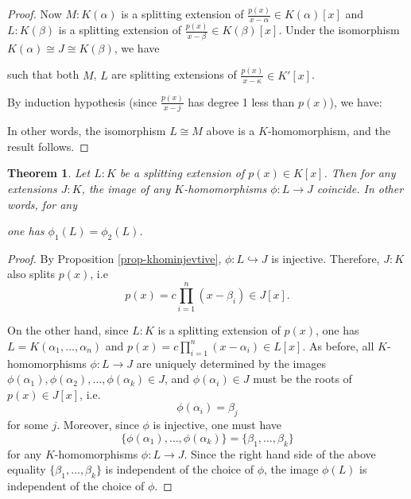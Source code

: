 \documentclass[11pt]{book}
\newtheorem{theorem}{Theorem}[section]
\begin{document}
\begin{proof}
Now $M:K(\alpha)$ is a splitting extension of $\frac{p(x)}{x - \alpha} \in K(\alpha)[x]$ and $L:K(\beta)$ is a splitting extension of $\frac{p(x)}{x - \beta} \in K(\beta)[x]$. Under the isomorphism $ K(\alpha) \cong J \cong K(\beta)$, we have
\begin{center} 
\end{center}
such that both $M$, $L$ are splitting extensions of $\frac{p(x)}{x - \kappa} \in K'[x]$. 

By induction hypothesis (since $\frac{p(x)}{x - j}$ has degree 1 less than $p(x)$), we have:
\begin{center} 
\end{center}
In other words, the isomorphism $L \cong M$ above is a $K$-homomorphism, and the result follows.
\end{proof}

\begin{theorem} \label{thm-splittingfieldsameimage}
Let $L:K$ be a splitting extension of $p(x) \in K[x]$. Then for any extensions $J:K$, the image of any $K$-homomorphisms $\phi: L \to J$ coincide. In other words, for any
\begin{center}
\end{center}
one has $\phi_1(L) = \phi_2(L)$.
\end{theorem}

\begin{proof}
By Proposition \ref{prop-khominjevtive}, $\phi: L \hookrightarrow J$ is injective. Therefore, $J:K$ also splits $p(x)$, i.e 
$$p(x) = c \prod_{i=1}^n (x-\beta_i) \in J[x].$$ 

On the other hand, since $L:K$ is a splitting extension of $p(x)$, one has $L = K(\alpha_1, \dots,\alpha_n)$ and
$\displaystyle p(x) = c \prod_{i=1}^n (x-\alpha_i) \in L[x]$.
As before, all $K$-homomorphisms $\phi: L \to J$ are uniquely determined by the images $\phi(\alpha_1), \phi(\alpha_2), \ldots, \phi(\alpha_k) \in J$, and $\phi(\alpha_i) \in J$ must be the roots of $p(x) \in J[x]$, i.e.
$$\phi(\alpha_i) = \beta_j$$
for some $j$. Moreover, since $\phi$ is injective, one must have
$$\{\phi(\alpha_1), \ldots, \phi(\alpha_k)\} = \{\beta_1, \ldots, \beta_k\}$$
for any $K$-homomorphisms $\phi: L \to J$. Since the right hand side of the above equality $\{\beta_1, \ldots, \beta_k\}$ is independent of the choice of $\phi$, the image $\phi(L)$ is independent of the choice of $\phi$.
\end{proof}
\end{document}
